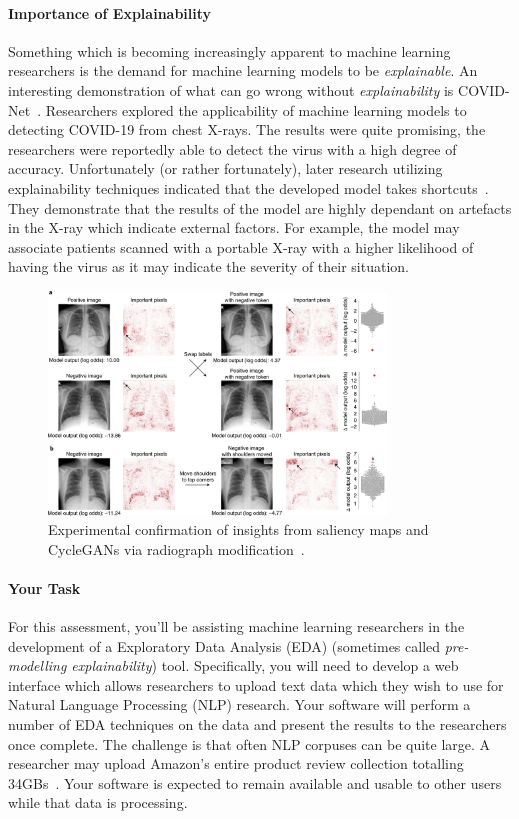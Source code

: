 \documentclass{csse4400}
\begin{document}
\paragraph{Importance of Explainability}
Something which is becoming increasingly apparent to machine learning researchers is the demand for machine learning models to be \textsl{explainable}.
An interesting demonstration of what can go wrong without \textsl{explainability} is COVID-Net~\cite{covidnet}.
Researchers explored the applicability of machine learning models to detecting COVID-19 from chest X-rays.
The results were quite promising, the researchers were reportedly able to detect the virus with a high degree of accuracy.
Unfortunately (or rather fortunately), later research utilizing explainability techniques indicated that the developed model takes shortcuts~\cite{covidnet-debunk}.
They demonstrate that the results of the model are highly dependant on artefacts in the X-ray which indicate external factors.
For example, the model may associate patients scanned with a portable X-ray with a higher likelihood of having the virus as it may indicate the severity of their situation.

\begin{figure}[ht]
  \begin{center}
    \includegraphics[width=0.8\textwidth]{covidnet-markers}
  \end{center}
  \caption{Experimental confirmation of insights from saliency maps and CycleGANs via radiograph modification~\cite{covidnet-debunk}.}
\end{figure}

\paragraph{Your Task}
For this assessment, you'll be assisting machine learning researchers in the development of a Exploratory Data Analysis (EDA)
(sometimes called \textsl{pre-modelling explainability}) tool.
Specifically, you will need to develop a web interface which allows researchers to upload text data which they wish to use for
Natural Language Processing (NLP) research.
Your software will perform a number of EDA techniques on the data and present the results to the researchers once complete.
The challenge is that often NLP corpuses can be quite large.
A researcher may upload Amazon's entire product review collection totalling 34GBs~\cite{amazon-reviews}.
Your software is expected to remain available and usable to other users while that data is processing.
\end{document}
